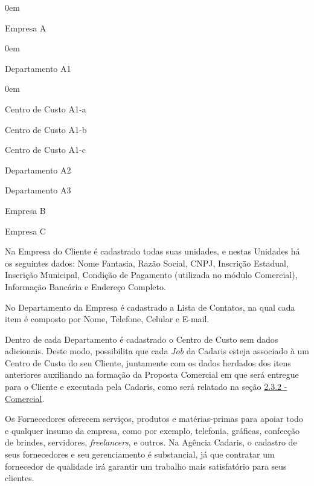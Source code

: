 \documentclass[
  12pt,            %
  openany,
  oneside,
  a4paper,         %
  english,      %
  brazil
]{article}
\numberwithin{figure}{section}
\numberwithin{table}{section}
\newcounter{subsubsubsection}[subsubsection]
\begin{document}
\vspace{-10mm}
\begin{singlespace}
  \begin{description}
    \itemsep0em
    \item[$\bullet$~~~10] Empresa A
    \begin{description}
      \itemsep0em
      \item[$\bullet$~~~10.01] Departamento A1
      \begin{description}
        \itemsep0em
        \item[$\bullet$~~~10.01.01] Centro de Custo A1-a
        \item[$\bullet$~~~10.01.02] Centro de Custo A1-b
        \item[$\bullet$~~~10.01.03] Centro de Custo A1-c
      \end{description}
      \item[$\bullet$~~~10.02] Departamento A2
      \item[$\bullet$~~~10.03] Departamento A3
    \end{description}
    \item[$\bullet$~~~20] Empresa B
    \item[$\bullet$~~~30] Empresa C
  \end{description}
\end{singlespace}
\vspace{-5mm}

Na Empresa do Cliente é cadastrado todas suas unidades, e nestas Unidades há os seguintes dados: Nome Fantasia, Razão Social, CNPJ, Inscrição Estadual, Inscrição Municipal, Condição de Pagamento (utilizada no módulo Comercial), Informação Bancária e Endereço Completo.

No Departamento da Empresa é cadastrado a Lista de Contatos, na qual cada item é composto por Nome, Telefone, Celular e E-mail.

Dentro de cada Departamento é cadastrado o Centro de Custo sem dados adicionais. Deste modo, possibilita que cada \textit{Job} da Cadaris esteja associado à um Centro de Custo do seu Cliente, juntamente com os dados herdados dos itens anteriores auxiliando na formação da Proposta Comercial em que será entregue para o Cliente e executada pela Cadaris, como será relatado na seção \hyperref[sec:2.3.2]{2.3.2 - Comercial}.



Os Fornecedores oferecem serviços, produtos e matérias-primas para apoiar todo e qualquer insumo da empresa, como por exemplo, telefonia, gráficas, confecção de brindes, servidores, \textit{freelancers}, e outros. Na Agência Cadaris, o cadastro de seus fornecedores e seu gerenciamento é substancial, já que contratar um fornecedor de qualidade irá garantir um trabalho mais satisfatório para seus clientes.
\end{document}
